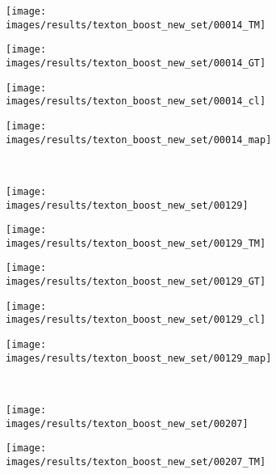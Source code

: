 \begin{figure}[t]
\begin{subfigure}[c]{0.19\textwidth}
 \end{subfigure}
 \begin{subfigure}[c]{0.19\textwidth}
  \centering
  \texttt{[image: images/results/texton\_boost\_new\_set/00014\_TM]}
 \end{subfigure}
 \begin{subfigure}[c]{0.19\textwidth}
  \centering
  \texttt{[image: images/results/texton\_boost\_new\_set/00014\_GT]}
 \end{subfigure}
 \begin{subfigure}[c]{0.19\textwidth}
  \centering
  \texttt{[image: images/results/texton\_boost\_new\_set/00014\_cl]}
 \end{subfigure}
 \begin{subfigure}[c]{0.19\textwidth}
  \centering
  \texttt{[image: images/results/texton\_boost\_new\_set/00014\_map]}
 \end{subfigure}
 \\
 \begin{subfigure}[c]{0.19\textwidth}
  \centering
  \texttt{[image: images/results/texton\_boost\_new\_set/00129]}
 \end{subfigure}
 \begin{subfigure}[c]{0.19\textwidth}
  \centering
  \texttt{[image: images/results/texton\_boost\_new\_set/00129\_TM]}
 \end{subfigure}
 \begin{subfigure}[c]{0.19\textwidth}
  \centering
  \texttt{[image: images/results/texton\_boost\_new\_set/00129\_GT]}
 \end{subfigure}
 \begin{subfigure}[c]{0.19\textwidth}
  \centering
  \texttt{[image: images/results/texton\_boost\_new\_set/00129\_cl]}
 \end{subfigure}
 \begin{subfigure}[c]{0.19\textwidth}
  \centering
  \texttt{[image: images/results/texton\_boost\_new\_set/00129\_map]}
 \end{subfigure}
 \\
 \begin{subfigure}[c]{0.19\textwidth}
  \centering
  \texttt{[image: images/results/texton\_boost\_new\_set/00207]}
 \end{subfigure}
 \begin{subfigure}[c]{0.19\textwidth}
  \centering
  \texttt{[image: images/results/texton\_boost\_new\_set/00207\_TM]}

\end{subfigure}
\end{figure}
